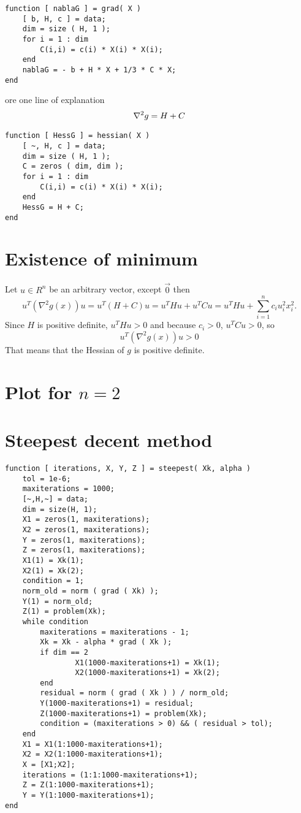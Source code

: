 \documentclass[a4paper,12pt]{article}
\begin{document}
\begin{lstlisting}
function [ nablaG ] = grad( X )
	[ b, H, c ] = data;
	dim = size ( H, 1 );
	for i = 1 : dim
	    C(i,i) = c(i) * X(i) * X(i);
	end
	nablaG = - b + H * X + 1/3 * C * X;
end
\end{lstlisting}

ore one line of explanation
\begin{align}\label{hess}
{\bf\nabla}^2 g =  H + C
\end{align}

\begin{lstlisting}
function [ HessG ] = hessian( X )
	[ ~, H, c ] = data;
	dim = size ( H, 1 );
	C = zeros ( dim, dim );
	for i = 1 : dim
		C(i,i) = c(i) * X(i) * X(i);
	end
	HessG = H + C;
end
\end{lstlisting}


\section{Existence of minimum}
Let $u\in R^n$ be an arbitrary vector, except $\vec{0}$ then
$$u^T(\nabla^2g(x))u = u^T (H+C) u = u^T H u + u^TCu = u^THu + \sum_{i=1}^n c_iu_i^2x_i^2.$$
Since $H$ is positive definite, $u^THu>0$ and because $c_i>0$, $u^TCu>0$, so 
$$u^T(\nabla^2g(x))u>0$$ 
That means that the Hessian of $g$ is positive definite.
\section{Plot for $n=2$}

\section{Steepest decent method}
\begin{lstlisting}
function [ iterations, X, Y, Z ] = steepest( Xk, alpha )
	tol = 1e-6;
	maxiterations = 1000;
	[~,H,~] = data;
	dim = size(H, 1);
	X1 = zeros(1, maxiterations);
	X2 = zeros(1, maxiterations);
	Y = zeros(1, maxiterations);
	Z = zeros(1, maxiterations);
	X1(1) = Xk(1);
	X2(1) = Xk(2);
	condition = 1;
	norm_old = norm ( grad ( Xk) );
	Y(1) = norm_old;
	Z(1) = problem(Xk);
	while condition
		maxiterations = maxiterations - 1;
		Xk = Xk - alpha * grad ( Xk );
		if dim == 2
				X1(1000-maxiterations+1) = Xk(1);
				X2(1000-maxiterations+1) = Xk(2);
		end
		residual = norm ( grad ( Xk ) ) / norm_old;
		Y(1000-maxiterations+1) = residual;
		Z(1000-maxiterations+1) = problem(Xk);
		condition = (maxiterations > 0) && ( residual > tol);
	end
	X1 = X1(1:1000-maxiterations+1);
	X2 = X2(1:1000-maxiterations+1);
	X = [X1;X2];
	iterations = (1:1:1000-maxiterations+1);
	Z = Z(1:1000-maxiterations+1);
	Y = Y(1:1000-maxiterations+1);
end
\end{lstlisting}
\end{document}
